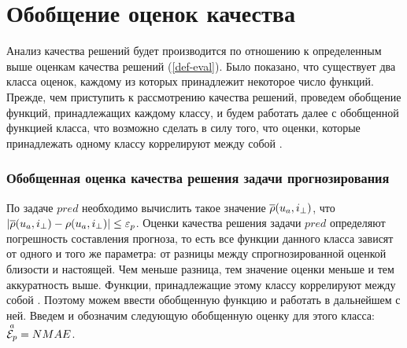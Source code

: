 \section{Обобщение оценок качества}
Анализ качества решений будет
производится по отношению к определенным выше оценкам качества
решений (\ref{def-eval}).
Было показано, что существует два класса оценок, каждому из которых
принадлежит некоторое число функций. Прежде, чем приступить к рассмотрению
качества решений, проведем обобщение функций,
принадлежащих каждому классу,
и будем работать далее с обобщенной функцией класса, что возможно
сделать в силу того, что оценки, которые принадлежать одному классу коррелируют
между собой \cite{herloker-eval}.


\subsubsection{Обобщенная оценка качества решения задачи прогнозирования}
По задаче $pred$ необходимо вычислить такое значение
$\overline{\rho}(u_a, i_{\bot})$, что $|\overline{\rho}(u_a, i_{\bot}) - \rho(u_a, i_{\bot})| \le
\varepsilon_p$.
Оценки качества решения задачи $pred$
определяют погрешность
составления прогноза, то есть все функции данного класса зависят от одного и того же параметра: от
разницы между спрогнозированной оценкой близости и настоящей.
Чем меньше разница, тем значение оценки меньше и тем аккуратность выше. Функции, принадлежащие этому
классу коррелируют между собой  \cite{herloker-eval}. Поэтому можем ввести
обобщенную функцию и работать в дальнейшем с ней.
Введем и обозначим следующую обобщенную оценку
для этого класса: ${\overset{a}{\mathcal{E}_{p}}} = NMAE$.

